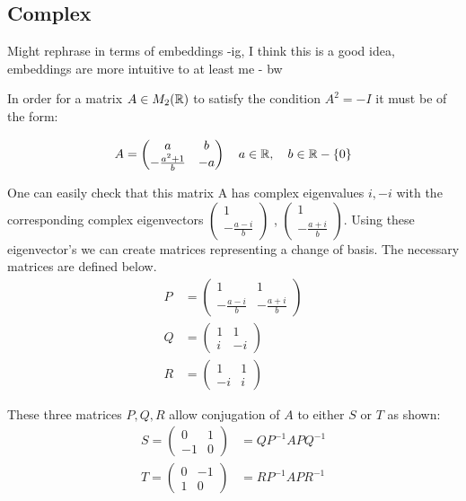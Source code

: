 \documentclass{article}
\begin{document}
\subsection{Complex}
{\color{blue} Might rephrase in terms of embeddings -ig, I think this is a good idea, embeddings are more intuitive to at least me - bw} 

In order for a matrix $A \in M_2(\protect\mathbb{R})$ to satisfy the condition $A^2 = -I$ it must be of the form:

\begin{align*}
A = 
\left(
\begin{matrix}
    a & b \\
    -\frac{a^2+1}{b} & -a 
\end{matrix} 
\right) \quad a \in \protect\mathbb{R}, \quad b \in \protect\mathbb{R}-\{0\}
\end{align*}

One can easily check that this matrix A has complex eigenvalues $i,-i$ with the corresponding complex eigenvectors 
$\left(
\begin{matrix}
    1 \\
    -\frac{a-i}{b}
\end{matrix}
\right)$
,
$\left(
\begin{matrix}
    1 \\
    -\frac{a+i}{b}
\end{matrix}
\right)$.
Using these eigenvector's we can create matrices representing a change of basis. The necessary matrices are defined below.
\begin{align*}
    P &= \left(
    \begin{matrix}
        1 & 1\\
        -\frac{a-i}{b} & -\frac{a+i}{b}
    \end{matrix}
    \right) \\
    Q &= \left(
    \begin{matrix}
        1 & 1\\
        i & -i 
    \end{matrix}
    \right) \\
    R &= \left(
    \begin{matrix}
        1 & 1\\
        -i & i
    \end{matrix}
    \right)
\end{align*}

These three matrices $P,Q,R$ allow conjugation of $A$ to either $S$ or $T$ as shown: 
\begin{align*}
    S = \left(\begin{matrix}
        0 & 1\\
        -1 & 0 
    \end{matrix}\right) &= QP^{-1}APQ^{-1} \\
    T = \left(\begin{matrix}
        0 & -1\\
        1 & 0 
    \end{matrix}\right) &= RP^{-1}APR^{-1}
\end{align*}
\end{document}
